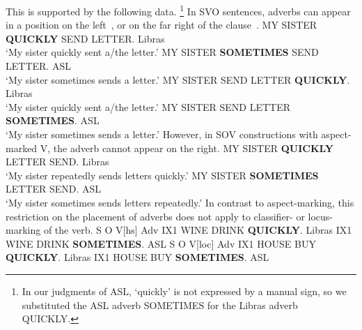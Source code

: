 \documentclass[output=paper,colorlinks,citecolor=brown,
]{langscibook}
\begin{document}
This is supported by the following data.%
\footnote{
    In our judgments of ASL, `quickly' is not expressed by a manual sign, so
    we substituted the ASL adverb SOMETIMES for the Libras adverb QUICKLY.
}
In SVO sentences, adverbs can appear in a position on the left~, or on the
far right of the clause~.
\ea 
    \label{lasz:ex:13}
    \ea 
        MY SISTER \textbf{QUICKLY} SEND\laszPlain{} LETTER.
        \hfill 
        \cmark Libras
        \\
         ‘My sister quickly sent a/the letter.’
    \ex 
        MY SISTER \textbf{SOMETIMES} SEND\laszPlain{} LETTER. 
        \hfill 
        \cmark ASL 
        \\ 
        ‘My sister sometimes sends a letter.’
    \z 
\ex 
    \label{lasz:ex:14}
    \ea 
        MY SISTER SEND\laszPlain{} LETTER \textbf{QUICKLY}.
        \hfill 
        \cmark Libras 
        \\ 
        ‘My sister quickly sent a/the letter.’
    \ex 
        MY SISTER SEND\laszPlain{} LETTER \textbf{SOMETIMES}.
        \hfill 
        \cmark ASL 
        \\ 
        ‘My sister sometimes sends a letter.’
    \z 
\z 
However, in SOV constructions with aspect-marked V, the adverb
cannot appear on the right.
\ea 
    \label{lasz:ex:15}
    \ea 
        MY SISTER \textbf{QUICKLY} LETTER SEND\laszAsp{}.
        \hfill 
        \cmark Libras
        \\ 
        ‘My sister repeatedly sends letters quickly.’
    \ex 
        MY SISTER \textbf{SOMETIMES} LETTER SEND\laszAsp{}.
        \hfill 
        \cmark ASL 
        \\ 
        ‘My sister sometimes sends letters repeatedly.’
    \z 
\ex 
    \label{lasz:ex:16}
    \z 
\z 
In contrast to aspect-marking, this restriction on the placement of
adverbs does not apply to classifier-  or locus-marking  of the
verb.
\ea 
    \label{lasz:ex:17}
    S O V[hs] Adv
    \ea 
         IX1 WINE DRINK\laszHs{\laszClaw} \textbf{QUICKLY}.
        \hfill 
        \cmark Libras
    \ex 
        IX1 WINE DRINK\laszHs{\laszClaw} \textbf{SOMETIMES}. 
        \hfill 
        \cmark ASL 
    \z 
\ex 
    \label{lasz:ex:18}
    S O V[loc] Adv
    \ea 
         IX1 HOUSE BUY \textbf{QUICKLY}. 
         \hfill 
         \cmark Libras
    \ex 
         IX1 HOUSE BUY \textbf{SOMETIMES}.
        \hfill 
        \cmark ASL
    \z 
\z 
\end{document}
